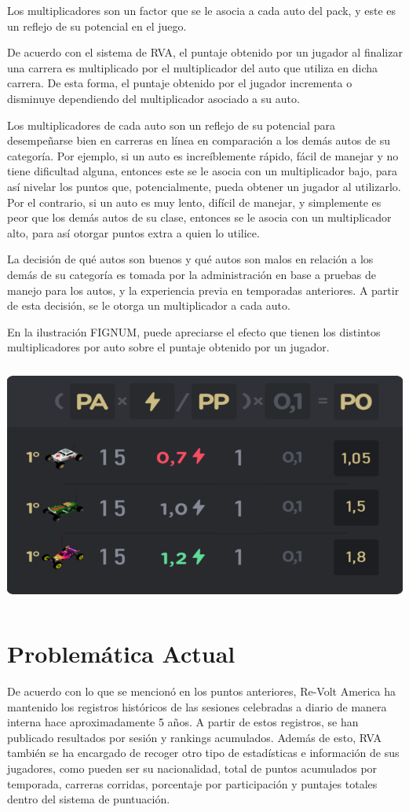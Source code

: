 Los multiplicadores son un factor que se le asocia a cada auto del pack, y este es un reflejo de su potencial en el juego.

De acuerdo con el sistema de RVA, el puntaje obtenido por un jugador al finalizar una carrera es multiplicado por el multiplicador del auto que utiliza en dicha carrera. De esta forma, el puntaje obtenido por el jugador incrementa o disminuye dependiendo del multiplicador asociado a su auto.

Los multiplicadores de cada auto son un reflejo de su potencial para desempeñarse bien en carreras en línea en comparación a los demás autos de su categoría. Por ejemplo, si un auto es increíblemente rápido, fácil de manejar y no tiene dificultad alguna, entonces este se le asocia con un multiplicador bajo, para así nivelar los puntos que, potencialmente, pueda obtener un jugador al utilizarlo. Por el contrario, si un auto es muy lento, difícil de manejar, y simplemente es peor que los demás autos de su clase, entonces se le asocia con un multiplicador alto, para así otorgar puntos extra a quien lo utilice.

La decisión de qué autos son buenos y qué autos son malos en relación a los demás de su categoría es tomada por la administración en base a pruebas de manejo para los autos, y la experiencia previa en temporadas anteriores. A partir de esta decisión, se le otorga un multiplicador a cada auto.

En la ilustración FIGNUM, puede apreciarse el efecto que tienen los distintos multiplicadores por auto sobre el puntaje obtenido por un jugador.

\includegraphics[width=15cm, height=8cm]{img/multiplier.png}

\section{Problemática Actual}
De acuerdo con lo que se mencionó en los puntos anteriores, Re-Volt America ha mantenido los registros históricos de las sesiones celebradas a diario de manera interna hace aproximadamente 5 años. A partir de estos registros, se han publicado resultados por sesión y rankings acumulados. Además de esto, RVA también se ha encargado de recoger otro tipo de estadísticas e información de sus jugadores, como pueden ser su nacionalidad, total de puntos acumulados por temporada, carreras corridas, porcentaje por participación y puntajes totales dentro del sistema de puntuación.

